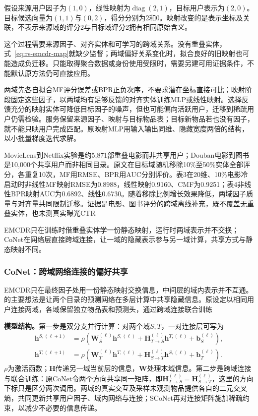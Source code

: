 假设来源用户因子为$(1,0)$，线性映射为$\operatorname{diag}(2,1)$，目标用户表示为$(2,0)$。目标候选向量为$(1,1)$与$(0,2)$，得分分别为2和0。映射改变的是表示坐标及关联，不表示来源域的评分2与目标域评分2拥有相同原始含义。

这个过程需要来源因子、对齐实体和可学习的跨域关系。没有重叠实体，式~\eqref{eq:rs-emcdr-map}就缺少监督；两域偏好关系变化时，拟合良好的旧映射也可能造成负迁移。只能取得聚合数据或身份使用受限时，需要另建可用证据条件，不能默认原方法仍可直接应用。

两域先各自拟合MF评分误差或BPR正负次序，不要求潜在坐标直接可比；映射阶段固定这些因子，以两域均有足够反馈的对齐实体训练MLP或线性映射。选择反馈充分的映射实体可降低目标因子的噪声，但也可能偏向活跃用户，迁移到稀疏用户仍需检验。服务保留来源因子、映射与目标物品表；目标新物品若也没有因子，就不能只映用户完成匹配。原映射MLP用输入输出同维、隐藏宽度两倍的结构，以小批量梯度迭代求解。

MovieLens到Netflix实验是约5,871部重叠电影而非共享用户；Douban电影到图书是10,000个共享用户而非相同目录。原文在目标域随机移除10\%至50\%实体全部评分，各重复10次，MF用RMSE、BPR用AUC分别评价。表3在20维、10\%电影冷启动时非线性MF映射RMSE为0.8988，线性映射0.9160、CMF为0.9251；表4非线性BPR映射AUC为0.6892、线性0.6730。随着移除比例增长效果降低，两域因子质量与对齐量共同限制迁移。证据是电影、图书评分的跨域离线补充，既不覆盖无重叠实体，也未测真实曝光CTR

EMCDR只在训练时借重叠实体学一份静态映射，运行时两域表示并不交换；CoNet在网络层直接跨域连接，让一域的隐藏表示参与另一域计算，共享方式与静态映射不同。

\subsubsection{CoNet：跨域网络连接的偏好共享}
\label{sec:rs-conet}

EMCDR只在最终因子处用一份静态映射交换信息，中间层的域内表示并不互通。的主要想法是让两个目录的预测网络在多层计算中共享隐藏信息。原设定以相同用户连接两域，各域保留独立物品表和预测头，通过跨域连接联合训练

\textbf{模型结构。}第一步是双分支并行计算：对两个域$S,T$，一对连接层可写为
\begin{align}
  \bm{h}^{S,(\ell+1)}
    &=\rho(\bm{W}_S^{(\ell)}\bm{h}^{S,(\ell)}
           +\bm{H}_{T\to S}^{(\ell)}\bm{h}^{T,(\ell)}
           +\bm{b}_S^{(\ell)}),\\
  \bm{h}^{T,(\ell+1)}
    &=\rho(\bm{W}_T^{(\ell)}\bm{h}^{T,(\ell)}
           +\bm{H}_{S\to T}^{(\ell)}\bm{h}^{S,(\ell)}
           +\bm{b}_T^{(\ell)}).
  \label{eq:rs-conet-cross}
\end{align}
$\rho$为激活函数；$\bm{H}$传递另一域当前层的信息，$\bm{W}$处理本域信息。第二步是跨域连接与联合训练：原CoNet令两个方向共享同一矩阵，即$\bm{H}_{T\to S}^{(\ell)}=\bm{H}_{S\to T}^{(\ell)}$，这里的方向下标只是区分两次调用。两域的真实交互及采样未观测物品提供各自的二元交叉熵，共同更新共享用户因子、域内网络与连接；SCoNet再对连接矩阵施加稀疏约束，以减少不必要的信息传递。

